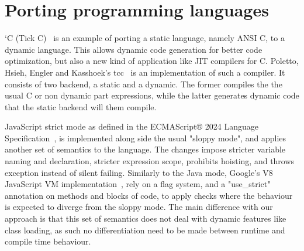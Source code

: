 \section{Porting programming languages}
`C (Tick C)~\cite{engler_c_1996} is an example of porting a static language, namely ANSI C, to a dynamic language. This allows dynamic code generation for better code optimization, 
but also a new kind of application like JIT compilers for C.
Poletto, Hsieh, Engler and Kasshoek's tcc~\cite{poletto_c_1999} is an implementation of such a compiler. It consists of two backend, a static and a dynamic.
The former compiles the the usual C or non dynamic part expressions, while the latter generates dynamic code that the static backend will them compile.

JavaScript strict mode as defined in the ECMAScript® 2024 Language Specification~\cite{noauthor_ecmascript_nodate}, is implemented along side the usual 
"sloppy mode", and applies another set of semantics to the language. The changes impose stricter variable naming and declaration, 
stricter expression scope, prohibits hoisting, and throws exception instead of silent failing.
Similarly to the Java mode, Google's V8 JavaScript VM implementation~\cite{noauthor_v8_nodate}, rely on a flag system, and a "use\_strict" 
annotation on methods and blocks of code, to apply checks where the behaviour is expected to diverge from the sloppy mode. 
The main difference with our approach is that this set of semantics does not deal with dynamic features like class loading, 
as such no differentiation need to be made between runtime and compile time behaviour. 



